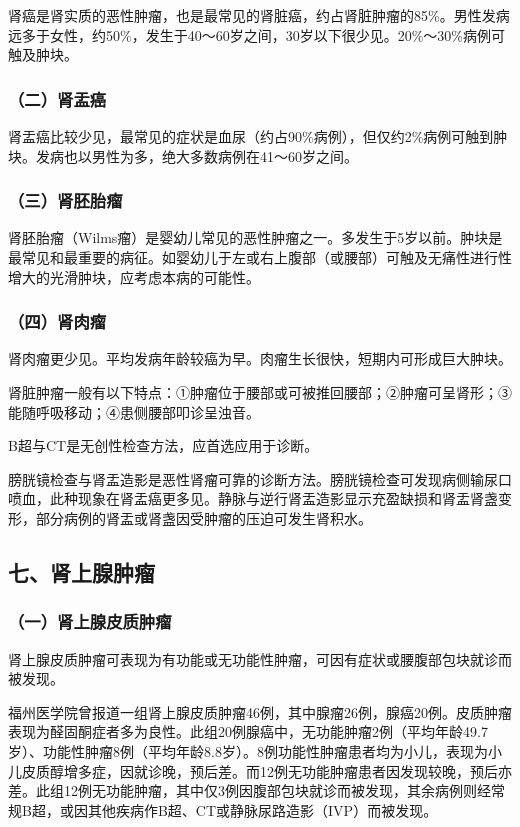 肾癌是肾实质的恶性肿瘤，也是最常见的肾脏癌，约占肾脏肿瘤的85\%。男性发病远多于女性，约50\%，发生于40～60岁之间，30岁以下很少见。20\%～30\%病例可触及肿块。

\subsubsection{（二）肾盂癌}

肾盂癌比较少见，最常见的症状是血尿（约占90\%病例），但仅约2\%病例可触到肿块。发病也以男性为多，绝大多数病例在41～60岁之间。

\subsubsection{（三）肾胚胎瘤}

肾胚胎瘤（Wilms瘤）是婴幼儿常见的恶性肿瘤之一。多发生于5岁以前。肿块是最常见和最重要的病征。如婴幼儿于左或右上腹部（或腰部）可触及无痛性进行性增大的光滑肿块，应考虑本病的可能性。

\subsubsection{（四）肾肉瘤}

肾肉瘤更少见。平均发病年龄较癌为早。肉瘤生长很快，短期内可形成巨大肿块。

肾脏肿瘤一般有以下特点：①肿瘤位于腰部或可被推回腰部；②肿瘤可呈肾形；③能随呼吸移动；④患侧腰部叩诊呈浊音。

B超与CT是无创性检查方法，应首选应用于诊断。

膀胱镜检查与肾盂造影是恶性肾瘤可靠的诊断方法。膀胱镜检查可发现病侧输尿口喷血，此种现象在肾盂癌更多见。静脉与逆行肾盂造影显示充盈缺损和肾盂肾盏变形，部分病例的肾盂或肾盏因受肿瘤的压迫可发生肾积水。

\subsection{七、肾上腺肿瘤}

\subsubsection{（一）肾上腺皮质肿瘤}

肾上腺皮质肿瘤可表现为有功能或无功能性肿瘤，可因有症状或腰腹部包块就诊而被发现。

福州医学院曾报道一组肾上腺皮质肿瘤46例，其中腺瘤26例，腺癌20例。皮质肿瘤表现为醛固酮症者多为良性。此组20例腺癌中，无功能肿瘤2例（平均年龄49.7岁）、功能性肿瘤8例（平均年龄8.8岁）。8例功能性肿瘤患者均为小儿，表现为小儿皮质醇增多症，因就诊晚，预后差。而12例无功能肿瘤患者因发现较晚，预后亦差。此组12例无功能肿瘤，其中仅3例因腹部包块就诊而被发现，其余病例则经常规B超，或因其他疾病作B超、CT或静脉尿路造影（IVP）而被发现。

